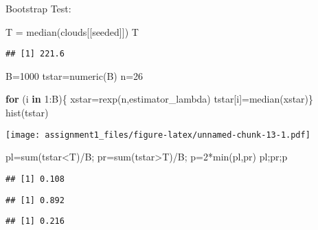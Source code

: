 \documentclass[
]{article}
\newenvironment{Shaded}{\begin{snugshade}}{\end{snugshade}}
\newcommand{\ControlFlowTok}[1]{\textcolor[rgb]{0.13,0.29,0.53}{\textbf{#1}}}
\newcommand{\DecValTok}[1]{\textcolor[rgb]{0.00,0.00,0.81}{#1}}
\newcommand{\FunctionTok}[1]{\textcolor[rgb]{0.00,0.00,0.00}{#1}}
\newcommand{\NormalTok}[1]{#1}
\newcommand{\OtherTok}[1]{\textcolor[rgb]{0.56,0.35,0.01}{#1}}
\newcommand{\SpecialCharTok}[1]{\textcolor[rgb]{0.00,0.00,0.00}{#1}}
\newcommand{\StringTok}[1]{\textcolor[rgb]{0.31,0.60,0.02}{#1}}
\begin{document}
Bootstrap Test:

\begin{Shaded}
\begin{Highlighting}[]
\NormalTok{T }\OtherTok{=} \FunctionTok{median}\NormalTok{(clouds[[}\StringTok{\textquotesingle{}seeded\textquotesingle{}}\NormalTok{]])}
\NormalTok{T}
\end{Highlighting}
\end{Shaded}

\begin{verbatim}
## [1] 221.6
\end{verbatim}

\begin{Shaded}
\begin{Highlighting}[]
\NormalTok{B}\OtherTok{=}\DecValTok{1000}
\NormalTok{tstar}\OtherTok{=}\FunctionTok{numeric}\NormalTok{(B)}
\NormalTok{n}\OtherTok{=}\DecValTok{26}

\ControlFlowTok{for}\NormalTok{ (i }\ControlFlowTok{in} \DecValTok{1}\SpecialCharTok{:}\NormalTok{B)\{}
\NormalTok{  xstar}\OtherTok{=}\FunctionTok{rexp}\NormalTok{(n,estimator\_lambda)}
\NormalTok{  tstar[i]}\OtherTok{=}\FunctionTok{median}\NormalTok{(xstar)\}}
\FunctionTok{hist}\NormalTok{(tstar)}
\end{Highlighting}
\end{Shaded}

\texttt{[image: assignment1\_files/figure-latex/unnamed-chunk-13-1.pdf]}

\begin{Shaded}
\begin{Highlighting}[]
\NormalTok{pl}\OtherTok{=}\FunctionTok{sum}\NormalTok{(tstar}\SpecialCharTok{\textless{}}\NormalTok{T)}\SpecialCharTok{/}\NormalTok{B; pr}\OtherTok{=}\FunctionTok{sum}\NormalTok{(tstar}\SpecialCharTok{\textgreater{}}\NormalTok{T)}\SpecialCharTok{/}\NormalTok{B; p}\OtherTok{=}\DecValTok{2}\SpecialCharTok{*}\FunctionTok{min}\NormalTok{(pl,pr)}
\NormalTok{pl;pr;p}
\end{Highlighting}
\end{Shaded}

\begin{verbatim}
## [1] 0.108
\end{verbatim}

\begin{verbatim}
## [1] 0.892
\end{verbatim}

\begin{verbatim}
## [1] 0.216
\end{verbatim}
\end{document}
